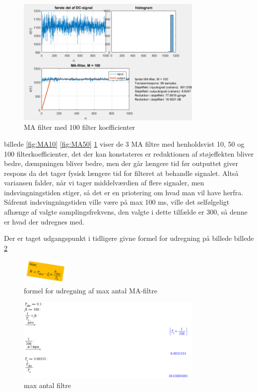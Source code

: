 \documentclass{article}
\begin{document}
\begin{figure}[h!]
  \centering
  \includegraphics[width=0.8\textwidth]{rod/1MAfilter100.png}
  \caption{MA filter med 100 filter koefficienter}
  \label{fig:MA100}
\end{figure}

billede \ref{fig:MA10} \ref{fig:MA50} \ref{fig:MA100} viser de 3 MA filtre med henholdsvist 10, 50 og 100 filterkoefficienter, det der kan konstateres er reduktionen af støjeffekten bliver bedre, dæmpningen bliver bedre, men der går længere tid før outputtet giver respons da det tager fysisk længere tid for filteret at behandle signalet.
Altså variansen falder, når vi tager middelværdien af flere signaler, men indsvingningstiden stiger, så det er en priotering om hvad man vil have herfra.
Såfremt indsvingningstiden ville være på max 100 ms, ville det selfølgeligt afhænge af valgte samplingsfrekvens, den valgte i dette tilfælde er 300, så denne er hvad der udregnes med.

Der er taget udgangspunkt i tidligere givne formel for udregning på billede billede \ref{fig:formel}

\begin{figure}[h!]
  \centering
  \includegraphics[width=0.2\textwidth]{rod/formel.png}
  \caption{formel for udregning af max antal MA-filtre}
  \label{fig:formel}
\end{figure}

\begin{figure}[h!]
  \centering
  \includegraphics[width=0.8\textwidth]{rod/Max_udregning.png}
  \caption{max antal filtre}
  \label{fig:max_filtre}
\end{figure}
\end{document}
